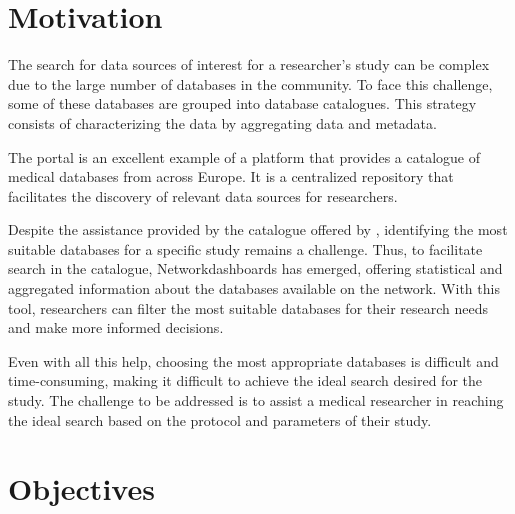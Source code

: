 \section{Motivation}

The search for data sources of interest for a researcher’s study can be complex due to the large number of databases in the community. To face this challenge, some of these databases are grouped into database catalogues. This strategy consists of characterizing the data by aggregating data and metadata.

The {\ehden} portal is an excellent example of a platform that provides a catalogue of medical databases from across Europe. It is a centralized repository that facilitates the discovery of relevant data sources for researchers.

Despite the assistance provided by the catalogue offered by {\ehden}, identifying the most suitable databases for a specific study remains a challenge. Thus, to facilitate search in the catalogue, Networkdashboards has emerged, offering statistical and aggregated information about the databases available on the {\ehden} network. With this tool, researchers can filter the most suitable databases for their research needs and make more informed decisions.

Even with all this help, choosing the most appropriate databases is difficult and time-consuming, making it difficult to achieve the ideal search desired for the study. The challenge to be addressed is to assist a medical researcher in reaching the ideal search based on the protocol and parameters of their study.


\section{Objectives}



